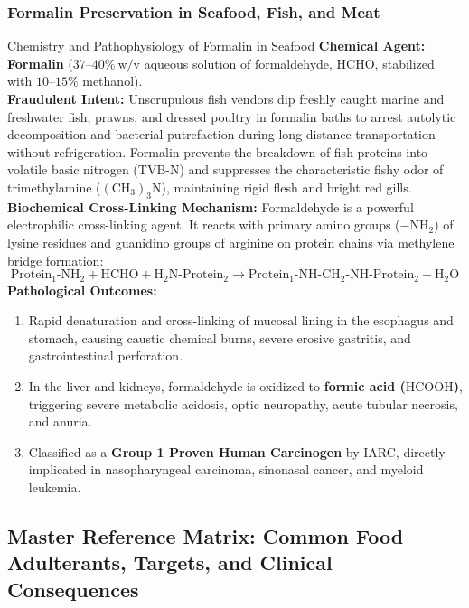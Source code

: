 \documentclass[11pt,a4paper,oneside]{article}
\begin{document}
\subsubsection{Formalin Preservation in Seafood, Fish, and Meat}
\begin{hazardbox}{Chemistry and Pathophysiology of Formalin in Seafood}
\textbf{Chemical Agent:} \textbf{Formalin} ($37\text{--}40\%\ \text{w/v}$ aqueous solution of formaldehyde, $\mathrm{HCHO}$, stabilized with $10\text{--}15\%$ methanol).\\
\textbf{Fraudulent Intent:} Unscrupulous fish vendors dip freshly caught marine and freshwater fish, prawns, and dressed poultry in formalin baths to arrest autolytic decomposition and bacterial putrefaction during long-distance transportation without refrigeration. Formalin prevents the breakdown of fish proteins into volatile basic nitrogen (TVB-N) and suppresses the characteristic fishy odor of trimethylamine ($\mathrm{(CH_3)_3N}$), maintaining rigid flesh and bright red gills.\\
\textbf{Biochemical Cross-Linking Mechanism:} Formaldehyde is a powerful electrophilic cross-linking agent. It reacts with primary amino groups ($-\mathrm{NH_2}$) of lysine residues and guanidino groups of arginine on protein chains via methylene bridge formation:
$$\mathrm{Protein_1\text{-}NH_2 + HCHO + H_2N\text{-}Protein_2 \longrightarrow Protein_1\text{-}NH\text{-}CH_2\text{-}NH\text{-}Protein_2 + H_2O}$$
\textbf{Pathological Outcomes:}
\begin{enumerate}
    \item Rapid denaturation and cross-linking of mucosal lining in the esophagus and stomach, causing caustic chemical burns, severe erosive gastritis, and gastrointestinal perforation.
    \item In the liver and kidneys, formaldehyde is oxidized to \textbf{formic acid ($\mathrm{HCOOH}$)}, triggering severe metabolic acidosis, optic neuropathy, acute tubular necrosis, and anuria.
    \item Classified as a \textbf{Group 1 Proven Human Carcinogen} by IARC, directly implicated in nasopharyngeal carcinoma, sinonasal cancer, and myeloid leukemia.
\end{enumerate}
\end{hazardbox}

\subsection{Master Reference Matrix: Common Food Adulterants, Targets, and Clinical Consequences}
\end{document}
